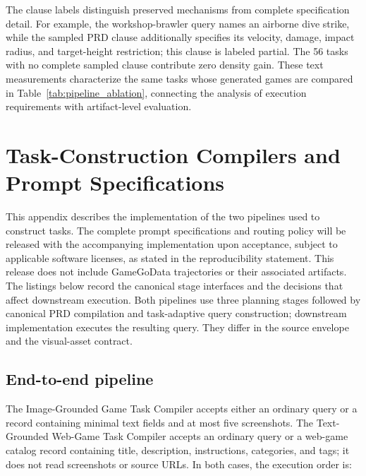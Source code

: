 \documentclass{article}
\begin{document}
The clause labels distinguish preserved mechanisms from complete specification detail. For example, the workshop-brawler query names an airborne dive strike, while the sampled PRD clause additionally specifies its velocity, damage, impact radius, and target-height restriction; this clause is labeled partial. The 56 tasks with no complete sampled clause contribute zero density gain. These text measurements characterize the same tasks whose generated games are compared in Table~\ref{tab:pipeline_ablation}, connecting the analysis of execution requirements with artifact-level evaluation.


\section{Task-Construction Compilers and Prompt Specifications}
\label{app:harness_prompts}

This appendix describes the implementation of the two pipelines used to construct tasks. The complete prompt specifications and routing policy will be released with the accompanying implementation upon acceptance, subject to applicable software licenses, as stated in the reproducibility statement. This release does not include GameGoData trajectories or their associated artifacts. The listings below record the canonical stage interfaces and the decisions that affect downstream execution. Both pipelines use three planning stages followed by canonical PRD compilation and task-adaptive query construction; downstream implementation executes the resulting query. They differ in the source envelope and the visual-asset contract.

\subsection{End-to-end pipeline}
\label{app:harness_pipeline}

The Image-Grounded Game Task Compiler accepts either an ordinary query or a record containing minimal text fields and at most five screenshots. The Text-Grounded Web-Game Task Compiler accepts an ordinary query or a web-game catalog record containing title, description, instructions, categories, and tags; it does not read screenshots or source URLs. In both cases, the execution order is:
\end{document}
